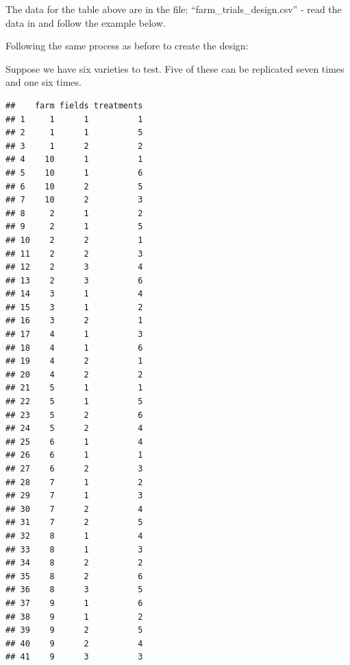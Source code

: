 \documentclass[
]{book}
\newenvironment{Shaded}{\begin{snugshade}}{\end{snugshade}}
\newcommand{\AttributeTok}[1]{\textcolor[rgb]{0.77,0.63,0.00}{#1}}
\newcommand{\DecValTok}[1]{\textcolor[rgb]{0.00,0.00,0.81}{#1}}
\newcommand{\FunctionTok}[1]{\textcolor[rgb]{0.00,0.00,0.00}{#1}}
\newcommand{\NormalTok}[1]{#1}
\newcommand{\OtherTok}[1]{\textcolor[rgb]{0.56,0.35,0.01}{#1}}
\newcommand{\SpecialCharTok}[1]{\textcolor[rgb]{0.00,0.00,0.00}{#1}}
\begin{document}
The data for the table above are in the file: ``farm\_trials\_design.csv'' - read the data in and follow the example below.

Following the same process as before to create the design:

Suppose we have six varieties to test. Five of these can be replicated seven times and one six times.

\begin{Shaded}
\end{Shaded}

\begin{verbatim}
##    farm fields treatments
## 1     1      1          1
## 2     1      1          5
## 3     1      2          2
## 4    10      1          1
## 5    10      1          6
## 6    10      2          5
## 7    10      2          3
## 8     2      1          2
## 9     2      1          5
## 10    2      2          1
## 11    2      2          3
## 12    2      3          4
## 13    2      3          6
## 14    3      1          4
## 15    3      1          2
## 16    3      2          1
## 17    4      1          3
## 18    4      1          6
## 19    4      2          1
## 20    4      2          2
## 21    5      1          1
## 22    5      1          5
## 23    5      2          6
## 24    5      2          4
## 25    6      1          4
## 26    6      1          1
## 27    6      2          3
## 28    7      1          2
## 29    7      1          3
## 30    7      2          4
## 31    7      2          5
## 32    8      1          4
## 33    8      1          3
## 34    8      2          2
## 35    8      2          6
## 36    8      3          5
## 37    9      1          6
## 38    9      1          2
## 39    9      2          5
## 40    9      2          4
## 41    9      3          3
\end{verbatim}
\end{document}
